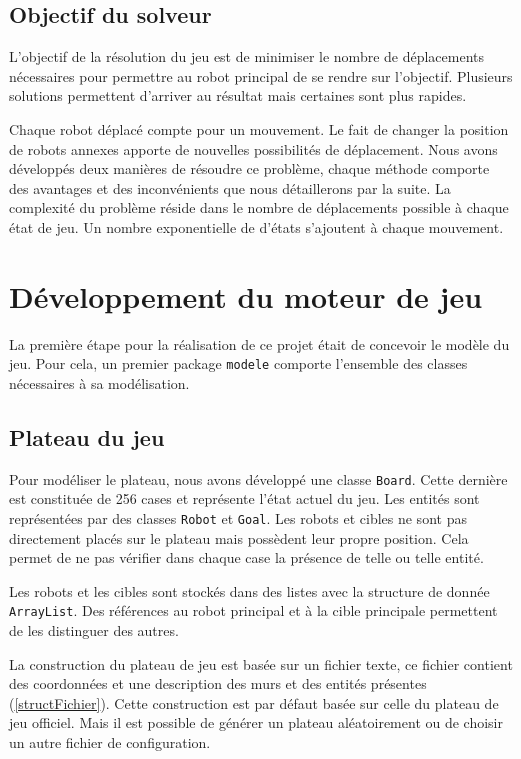 \documentclass[a4paper]{article} %
\begin{document}
	\subsection{Objectif du solveur}
L'objectif de la résolution du jeu est de minimiser le nombre de déplacements nécessaires pour permettre au robot principal de se rendre sur l'objectif. Plusieurs solutions permettent d'arriver au résultat mais certaines sont plus rapides.

Chaque robot déplacé compte pour un mouvement. Le fait de changer la position de robots annexes apporte de nouvelles possibilités de déplacement. Nous avons développés deux manières de résoudre ce problème, chaque méthode comporte des avantages et des inconvénients que nous détaillerons par la suite. La complexité du problème réside dans le nombre de déplacements possible à chaque état de jeu. Un nombre exponentielle de d'états s'ajoutent à chaque mouvement.

\section{Développement du moteur de jeu}
La première étape pour la réalisation de ce projet était de concevoir le modèle du jeu. Pour cela, un premier package \texttt{modele} comporte l'ensemble des classes nécessaires à sa modélisation.

	\subsection{Plateau du jeu}
Pour modéliser le plateau, nous avons développé une classe \texttt{Board}. Cette dernière est constituée de 256 cases et représente l'état actuel du jeu. Les entités sont représentées par des classes \texttt{Robot} et \texttt{Goal}. Les robots et cibles ne sont pas directement placés sur le plateau mais possèdent leur propre position. Cela permet de ne pas vérifier dans chaque case la présence de telle ou telle entité.

Les robots et les cibles sont stockés dans des listes avec la structure de donnée \texttt{ArrayList}. Des références au robot principal et à la cible principale permettent de les distinguer des autres.

La construction du plateau de jeu est basée sur un fichier texte, ce fichier contient des coordonnées et une description des murs et des entités présentes (\ref{structFichier}). Cette construction est par défaut basée sur celle du plateau de jeu officiel. Mais il est possible de générer un plateau aléatoirement ou de choisir un autre fichier de configuration.
\end{document}

